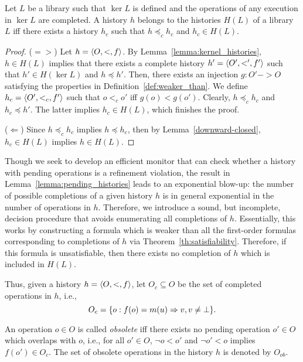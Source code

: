 \begin{lemma}\label{lemma:pending_histories}

Let $L$ be a library such that $\ker L$ is defined and the operations of any execution in $\ker L$ are completed.
A history $h$ belongs to the histories $H(L)$ of a library $L$ iff there exists 
a history $h_c$ such that $h\preceq_c h_c$ and $h_c\in H(L)$.

\end{lemma}

\begin{proof}

($=>$) Let $h=\left\langle {O,<,f} \right\rangle$. By Lemma~\ref{lemma:kernel_histories}, $h\in H(L)$ implies that there exists 
a complete history $h'=\left\langle {O',<',f'} \right\rangle$ such that $h'\in H(\ker L)$ and $h\preceq h'$. 
Then, there exists an injection $g:O' -> O$ 
satisfying the properties in Definition~\ref{def:weaker_than}. We define $h_c=\left\langle {O',<_c,f'} \right\rangle$ 
such that $o<_c o'$ iff $g(o) < g(o')$. Clearly, $h\preceq_c h_c$ and $h_c\preceq h'$. The latter implies
$h_c\in H(L)$, which finishes the proof.

($\Leftarrow$) Since $h\preceq_c h_c$ implies $h\preceq h_c$, then by Lemma~\ref{downward-closed},
$h_c\in H(L)$ implies $h\in H(L)$.

\end{proof}

Though we seek to develop an efficient monitor that can check whether a history with pending
operations is a refinement violation, the result in Lemma~\ref{lemma:pending_histories}
leads to an exponential blow-up: the number of possible completions of a given history $h$
is in general exponential in the number of operations in $h$. Therefore, we introduce
a sound, but incomplete, decision procedure that avoids enumerating all completions of $h$.
Essentially, this works by constructing a formula which is weaker than all the first-order formulas
corresponding to completions of $h$ via Theorem~\ref{th:satisfiability}. Therefore, if this formula
is unsatisfiable, then there exists no completion of $h$ which is included in $H(L)$.

Thus, given a history $h=\left\langle {O,<,f} \right\rangle$, let $O_c\subseteq O$ be the set of completed operations
in $h$, i.e., 
\[
O_c={\{ o:f(o)=m(u)=>v,v\neq\bot \}}.
\]

An operation $o\in O$ is called \emph{obsolete} iff there exists no pending operation $o'\in O$ which 
overlaps with $o$, i.e., for all $o'\in O$, $\neg o<o'$ and $\neg o'<o$ implies
$f(o')\in O_c$. The set of obsolete operations in the history $h$ is denoted by $O_{ob}$.

